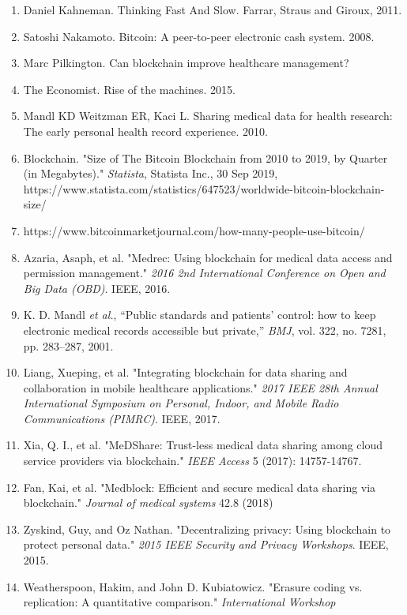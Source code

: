 \documentclass[]{article}
\begin{document}
\begin{enumerate}
\def\labelenumi{\arabic{enumi}.}
\item
  Daniel Kahneman. Thinking Fast And Slow. Farrar, Straus and Giroux,
  2011. 
\item
  Satoshi Nakamoto. Bitcoin: A peer-to-peer electronic cash system.
  2008. 
\item
  Marc Pilkington. Can blockchain improve healthcare management? 
\item
  The Economist. Rise of the machines. 2015. 
\item
  Mandl KD Weitzman ER, Kaci L. Sharing medical data for health
  research: The early personal health record experience. 2010. 
\item
  Blockchain. "Size of The Bitcoin Blockchain from 2010 to 2019, by
  Quarter (in Megabytes)." \emph{Statista}, Statista Inc., 30 Sep 2019,
  https://www.statista.com/statistics/647523/worldwide-bitcoin-blockchain-size/
\item
  https://www.bitcoinmarketjournal.com/how-many-people-use-bitcoin/
\item
  Azaria, Asaph, et al. "Medrec: Using blockchain for medical data
  access and permission management." \emph{2016 2nd International
  Conference on Open and Big Data (OBD)}. IEEE, 2016.
\item
  K. D. Mandl \emph{et al.}, ``Public standards and patients' control:
  how to keep electronic medical records accessible but private,''
  \emph{BMJ}, vol. 322, no. 7281, pp. 283--287, 2001.
\item
  Liang, Xueping, et al. "Integrating blockchain for data sharing and
  collaboration in mobile healthcare applications." \emph{2017 IEEE 28th
  Annual International Symposium on Personal, Indoor, and Mobile Radio
  Communications (PIMRC)}. IEEE, 2017.
\item
  Xia, Q. I., et al. "MeDShare: Trust-less medical data sharing among
  cloud service providers via blockchain." \emph{IEEE Access} 5 (2017):
  14757-14767.
\item
  Fan, Kai, et al. "Medblock: Efficient and secure medical data sharing
  via blockchain." \emph{Journal of medical systems} 42.8 (2018)
\item
  Zyskind, Guy, and Oz Nathan. "Decentralizing privacy: Using blockchain
  to protect personal data." \emph{2015 IEEE Security and Privacy
  Workshops}. IEEE, 2015.
\item
  Weatherspoon, Hakim, and John D. Kubiatowicz. "Erasure coding vs.
  replication: A quantitative comparison." \emph{International Workshop
}
\end{enumerate}
\end{document}
